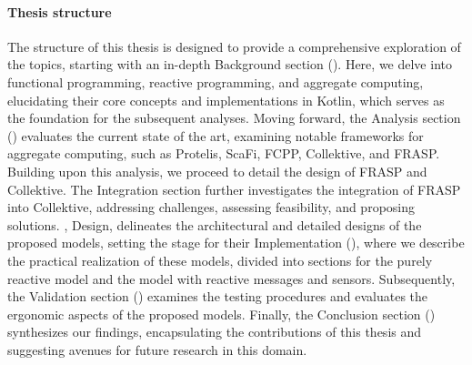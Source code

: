 \paragraph{Thesis structure}

The structure of this thesis is designed to provide a comprehensive exploration of the topics, starting with an in-depth Background section (). Here, we delve into functional programming, reactive programming, and aggregate computing, elucidating their core concepts and implementations in Kotlin, which serves as the foundation for the subsequent analyses. Moving forward, the Analysis section () evaluates the current state of the art, examining notable frameworks for aggregate computing, such as Protelis, ScaFi, FCPP, Collektive, and FRASP. Building upon this analysis, we proceed to detail the design of FRASP and Collektive. The Integration section further investigates the integration of FRASP into Collektive, addressing challenges, assessing feasibility, and proposing solutions. , Design, delineates the architectural and detailed designs of the proposed models, setting the stage for their Implementation (), where we describe the practical realization of these models, divided into sections for the purely reactive model and the model with reactive messages and sensors. Subsequently, the Validation section () examines the testing procedures and evaluates the ergonomic aspects of the proposed models. Finally, the Conclusion section () synthesizes our findings, encapsulating the contributions of this thesis and suggesting avenues for future research in this domain.
